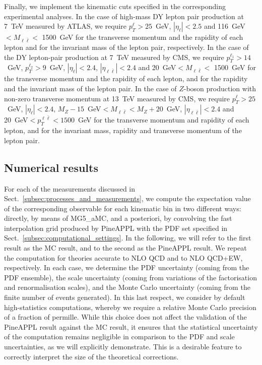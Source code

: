 Finally, we implement the kinematic cuts specified in the corresponding
experimental analyses. In the case of high-mass DY lepton pair
production at 7~TeV measured by ATLAS, we require $p_T^\ell>25$~GeV,
$|\eta_\ell|<2.5$ and 116~GeV$<M_{\ell\bar\ell}<$ 1500~GeV for the transverse
momentum and the rapidity of each lepton and for the invariant mass of the
lepton pair, respectively. In the case of the DY lepton-pair production at
7~TeV measured by CMS, we require $p_T^{\ell_1}>14$~GeV, $p_T^{\ell_2}>9$~GeV,
$|\eta_\ell|<2.4$, $|\eta_{\ell\bar\ell}|<2.4$ and 20~GeV$<M_{\ell\bar\ell}<$ 1500~GeV
for the transverse momentum and the rapidity of each lepton, and for the
rapidity and the invariant mass of the lepton pair. In the case of $Z$-boson
production with non-zero transverse momentum at 13~TeV measured by CMS, we
require $p_T^\ell>25$~GeV, $|\eta_\ell|<2.4$,
$M_Z-15$~GeV$<M_{\ell\bar\ell}<M_Z+20$~GeV,
$|\eta_{\ell\bar\ell}|<2.4$ and 20~GeV$<p_T^{\ell\bar\ell}<1500$~GeV for the
transverse momentum and rapidity of each lepton, and for the invariant mass,
rapidity and transverse momentum of the lepton pair.

\subsection{Numerical results}
\label{subsec:numerical_results}

For each of the measurements discussed in
Sect.~\ref{subsec:processes_and_measurements}, we compute the expectation
value of the corresponding observable for each kinematic bin in two different
ways: directly, by means of {\sc MG5\_aMC}, and a posteriori, by convolving the
fast interpolation grid produced by {\sc PineAPPL} with the PDF set specified
in Sect.~\ref{subsec:computational_settings}. In the following, we will refer
to the first result as the {\sc MC} result, and to the second as the
{\sc PineAPPL} result. We repeat the computation for theories accurate to NLO
QCD and to NLO QCD+EW, respectively. In each case, we determine the PDF
uncertainty (coming from the PDF ensemble), the scale uncertainty (coming from
variations of the factorisation and renormalisation scales), and the Monte
Carlo uncertainty (coming from the finite number of events generated). In this
last respect, we consider by default high-statistics computations, whereby we
require a relative Monte Carlo precision of a fraction of permille. While
this choice does not affect the validation of the {\sc PineAPPL} result against
the {\sc MC} result, it ensures that the statistical uncertainty of the
computation remains negligible in comparison to the PDF and scale uncertainties,
as we will explicitly demonstrate. This is a desirable feature to correctly
interpret the size of the theoretical corrections.

